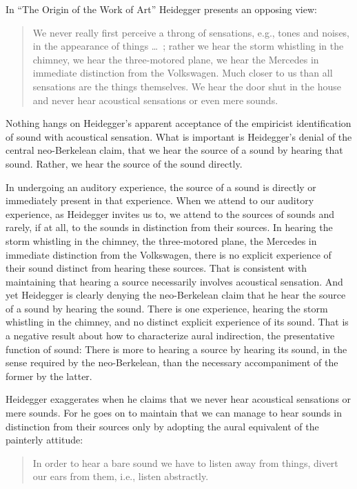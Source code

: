 In ``The Origin of the Work of Art'' Heidegger presents an opposing view:
\begin{quote}
    We never really first perceive a throng of sensations, e.g., tones and noises, in the appearance of things \ldots\ ; rather we hear the storm whistling in the chimney, we hear the three-motored plane, we hear the Mercedes in immediate distinction from the Volkswagen. Much closer to us than all sensations are the things themselves. We hear the door shut in the house and never hear acoustical sensations or even mere sounds. \citep[151--152]{Heidegger:1935uq}
\end{quote}
Nothing hangs on Heidegger's apparent acceptance of the empiricist identification of sound with acoustical sensation. What is important is Heidegger's denial of the central neo-Berkelean claim, that we hear the source of a sound by hearing that sound. Rather, we hear the source of the sound directly.

In undergoing an auditory experience, the source of a sound is directly or immediately present in that experience. When we attend to our auditory experience, as Heidegger invites us to, we attend to the sources of sounds and rarely, if at all, to the sounds in distinction from their sources. In hearing the storm whistling in the chimney, the three-motored plane, the Mercedes in immediate distinction from the Volkswagen, there is no explicit experience of their sound distinct from hearing these sources. That is consistent with maintaining that hearing a source necessarily involves acoustical sensation. And yet Heidegger is clearly denying the neo-Berkelean claim that he hear the source of a sound by hearing the sound. There is one experience, hearing the storm whistling in the chimney, and no distinct explicit experience of its sound. That is a negative result about how to characterize aural indirection, the presentative function of sound: There is more to hearing a source by hearing its sound, in the sense required by the neo-Berkelean, than the necessary accompaniment of the former by the latter.

Heidegger exaggerates when he claims that we never hear acoustical sensations or mere sounds. For he goes on to maintain that we can manage to hear sounds in distinction from their sources only by adopting the aural equivalent of the painterly attitude:
\begin{quote}
    In order to hear a bare sound we have to listen away from things, divert our ears from them, i.e., listen abstractly. \citep[152]{Heidegger:1935uq}
\end{quote}

